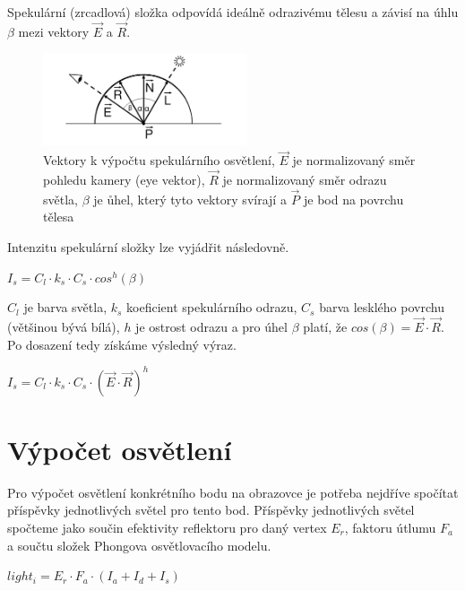 \documentclass[11pt,twoside,a4paper]{book}
\begin{document}
Spekulární (zrcadlová) složka odpovídá ideálně odrazivému tělesu a závisí na úhlu $\beta$ mezi vektory $\vec{E}$ a $\vec{R}$. 
\begin{center}
\begin{figure}[h!]
\includegraphics[width=60mm]{figures/phongS.png}
\caption{Vektory k výpočtu spekulárního osvětlení, $\vec{E}$ je normalizovaný směr pohledu kamery (eye vektor), $\vec{R}$ je normalizovaný směr odrazu světla, $\beta$ je ůhel, který tyto vektory svírají a $\vec{P}$ je bod na povrchu tělesa}
\end{figure}
\end{center}
Intenzitu spekulární složky lze vyjádřit následovně.
\begin{center}
$I_s = C_l \cdot k_s \cdot C_s \cdot cos^h(\beta)$
\end{center}
$C_l$ je barva světla, $k_s$ koeficient spekulárního odrazu, $C_s$ barva lesklého povrchu (většinou bývá bílá), $h$ je ostrost odrazu a pro úhel $\beta$ platí, že $cos(\beta) = \vec{E} \cdot \vec{R}$. Po dosazení tedy získáme výsledný výraz.
\begin{center}
$I_s = C_l \cdot k_s \cdot C_s \cdot (\vec{E} \cdot \vec{R})^h$
\end{center}

\section{Výpočet osvětlení}

Pro výpočet osvětlení konkrétního bodu na obrazovce je potřeba nejdříve spočítat příspěvky jednotlivých světel pro tento bod. Příspěvky jednotlivých světel spočteme jako součin efektivity reflektoru pro daný vertex $E_r$, faktoru útlumu $F_a$ a součtu složek Phongova osvětlovacího modelu.
\begin{center}
$light_i = E_r \cdot F_a \cdot (I_a + I_d + I_s)$
\end{center}
\end{document}
